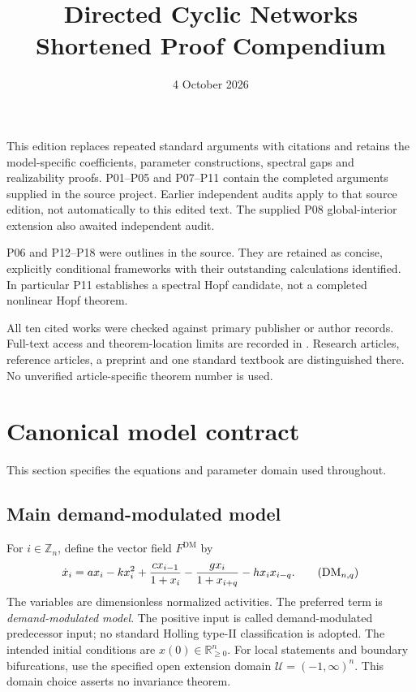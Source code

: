 \documentclass[11pt]{article}
\title{Directed Cyclic Networks\\Shortened Proof Compendium}
\author{}
\date{4 October 2026}
\newcommand{\R}{\mathbb{R}}
\newcommand{\Zn}{\mathbb{Z}_n}
\newcommand{\DM}{\mathrm{DM}}
\newcommand{\Orth}{\R_{\geq 0}^{n}}
\newcommand{\Domain}{\mathcal{U}}
\theoremstyle{definition}
\theoremstyle{remark}
\begin{document}
\maketitle
\noindent This edition replaces repeated standard arguments with citations
and retains the model-specific coefficients, parameter constructions,
spectral gaps and realizability proofs. P01--P05 and P07--P11 contain the
completed arguments supplied in the source project. Earlier independent
audits apply to that source edition, not automatically to this edited text.
The supplied P08 global-interior extension also awaited independent audit.

\medskip\noindent P06 and P12--P18 were outlines in the source.
They are retained as concise, explicitly conditional frameworks with
their outstanding calculations identified. In particular P11 establishes
a spectral Hopf candidate, not a completed nonlinear Hopf theorem.

\medskip\noindent All ten cited works were checked against primary
publisher or author records. Full-text access and theorem-location limits
are recorded in . Research articles,
reference articles, a preprint and one standard textbook are distinguished
there. No unverified article-specific theorem number is used.
\clearpage
\tableofcontents
\clearpage
\section{Canonical model contract}
\label{sec:canonical}
This section specifies the equations and parameter domain used throughout.

\subsection{Main demand-modulated model}
For $i\in\Zn$, define the vector field $F^{\DM}$ by
\begin{equation}
\label{eq:canonical-dm}
\dot{x}_i=a x_i-kx_i^2+\frac{c x_{i-1}}{1+x_i}
             -\frac{g x_i}{1+x_{i+q}}-h x_i x_{i-q}.
\tag{$\DM_{n,q}$}
\end{equation}
The variables are dimensionless normalized activities. The preferred term is
\emph{demand-modulated model}. The positive input is called demand-modulated
predecessor input; no standard Holling type-II classification is adopted.
The intended initial conditions are $x(0)\in\Orth$. For local statements and
boundary bifurcations, use the specified open extension domain
$\Domain=(-1,\infty)^n$. This domain choice asserts no invariance theorem.
\end{document}
